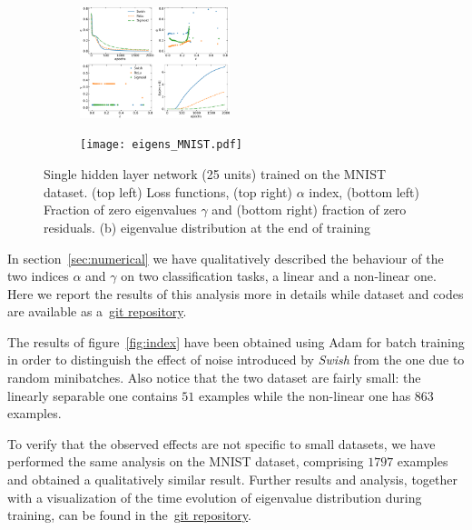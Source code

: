 \documentclass{article}
\begin{document}
%
\begin{figure}[t!]
\centering
\begin{subfigure}[]{}
\includegraphics[width= 0.48\textwidth]{mnist.pdf}
\label{fig:mnist}
\end{subfigure}
%
\begin{subfigure}[]{}
\texttt{[image: eigens\_MNIST.pdf]}
\end{subfigure}
%
\caption{ \label{fig:mnist} Single hidden layer network (25 units) trained on the MNIST dataset. (top left) Loss functions, (top right) $\alpha$ index, (bottom left) Fraction of zero eigenvalues $\gamma$ and (bottom right) fraction of zero residuals. (b) eigenvalue distribution at the end of training}
\end{figure}
%
In section~\eqref{sec:numerical} we have qualitatively described the behaviour of the two indices $\alpha$ and $\gamma$ on two classification tasks, a linear and a non-linear one. Here we report the results of this analysis more in details while dataset and codes are available as a~\href{https://github.com/WessZumino/meanfield-theory-of-activation-functions}{git repository}.

The results of figure~\eqref{fig:index} have been obtained using Adam for batch training in order to distinguish the effect of noise introduced by {\it Swish} from the one due to random minibatches. Also notice that the two dataset are fairly small: the linearly separable one contains $51$ examples while the non-linear one has $863$ examples.

To verify that the observed effects are not specific to small datasets, we have performed the same analysis on the MNIST dataset, comprising $1797$ examples and obtained a qualitatively similar result.
Further results and analysis, together with a visualization of the time evolution of eigenvalue distribution during training, can be found in the~\href{https://github.com/WessZumino/meanfield-theory-of-activation-functions}{git repository}.
\end{document}

